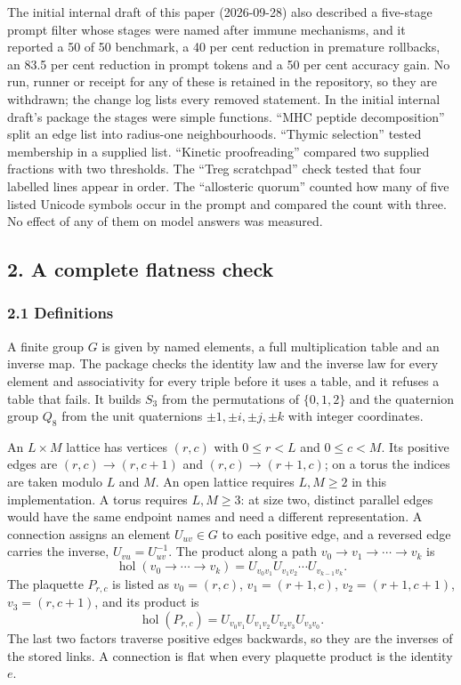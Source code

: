 \documentclass[
  11pt,
]{article}
\begin{document}
The initial internal draft of this paper (2026-09-28) also described a
five-stage prompt filter whose stages were named after immune
mechanisms, and it reported a 50 of 50 benchmark, a 40 per cent
reduction in premature rollbacks, an 83.5 per cent reduction in prompt
tokens and a 50 per cent accuracy gain. No run, runner or receipt for
any of these is retained in the repository, so they are withdrawn; the
change log lists every removed statement. In the initial internal
draft's package the stages were simple functions. ``MHC peptide
decomposition'' split an edge list into radius-one neighbourhoods.
``Thymic selection'' tested membership in a supplied list. ``Kinetic
proofreading'' compared two supplied fractions with two thresholds. The
``Treg scratchpad'' check tested that four labelled lines appear in
order. The ``allosteric quorum'' counted how many of five listed Unicode
symbols occur in the prompt and compared the count with three. No effect
of any of them on model answers was measured.

\hypertarget{a-complete-flatness-check}{%
\subsection{2. A complete flatness
check}\label{a-complete-flatness-check}}

\hypertarget{definitions}{%
\subsubsection{2.1 Definitions}\label{definitions}}

A finite group \(G\) is given by named elements, a full multiplication
table and an inverse map. The package checks the identity law and the
inverse law for every element and associativity for every triple before
it uses a table, and it refuses a table that fails. It builds \(S_3\)
from the permutations of \(\{0,1,2\}\) and the quaternion group \(Q_8\)
from the unit quaternions \(\pm 1, \pm i, \pm j, \pm k\) with integer
coordinates.

An \(L \times M\) lattice has vertices \((r,c)\) with \(0 \le r < L\)
and \(0 \le c < M\). Its positive edges are \((r,c) \to (r,c+1)\) and
\((r,c) \to (r+1,c)\); on a torus the indices are taken modulo \(L\) and
\(M\). An open lattice requires \(L,M \ge 2\) in this implementation. A
torus requires \(L,M \ge 3\): at size two, distinct parallel edges would
have the same endpoint names and need a different representation. A
connection assigns an element \(U_{uv} \in G\) to each positive edge,
and a reversed edge carries the inverse, \(U_{vu} = U_{uv}^{-1}\). The
product along a path \(v_0 \to v_1 \to \cdots \to v_k\) is
\[\operatorname{hol}(v_0 \to \cdots \to v_k) = U_{v_0 v_1} U_{v_1 v_2} \cdots U_{v_{k-1} v_k}.\]
The plaquette \(P_{r,c}\) is listed as \(v_0 = (r,c)\),
\(v_1 = (r+1,c)\), \(v_2 = (r+1,c+1)\), \(v_3 = (r,c+1)\), and its
product is
\[\operatorname{hol}(P_{r,c}) = U_{v_0 v_1} U_{v_1 v_2} U_{v_2 v_3} U_{v_3 v_0}.\]
The last two factors traverse positive edges backwards, so they are the
inverses of the stored links. A connection is flat when every plaquette
product is the identity \(e\).
\end{document}
